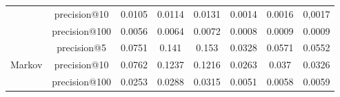 \documentclass[prodmode,acmtecs]{acmsmall} %
\begin{document}
\begin{table}[htbp]
\begin{tabular}{|c|c|c|c|c|c|c|c|}
		\cmidrule{2-8}          & precision@10 & 0.0105 & 0.0114 & 0.0131 & 0.0014 & 0.0016 & 0,0017 \\
		\cmidrule{2-8}          & precision@100 & 0.0056 & 0.0064 & 0.0072 & 0.0008 & 0.0009 & 0.0009 \\
		\midrule
		\multirow{3}[6]{*}{Markov} & precision@5 & 0.0751 & 0.141 & 0.153 & 0.0328 & 0.0571 & 0.0552 \\
		\cmidrule{2-8}          & precision@10 & 0.0762 & 0.1237 & 0.1216 & 0.0263 & 0.037 & 0.0326 \\
		\cmidrule{2-8}          & precision@100 & 0.0253 & 0.0288 & 0.0315 & 0.0051 & 0.0058 & 0.0059 \\
		\midrule
	\end{tabular}%
	\label{tab:precision5000}%
\end{table}%
\end{document}

